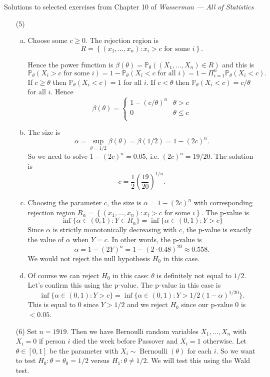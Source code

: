 \documentclass[10pt]{article}
\renewcommand{\P}{\mathbb{P}}
\newcommand{\Bern}{\operatorname{Bernoulli}}
\begin{document}
\noindent \large{Solutions to selected exercises from Chapter 10 of
\emph{Wasserman --- All of Statistics}}

\begin{enumerate}
\item[(5)]
\begin{enumerate}[(a)]
\item
Choose some $c \geq 0$. The rejection region is
\[
R = \left\{ (x_1,\ldots,x_n) : x_i > c \text{ for some } i\right\}.
\]

Hence the power function is $\beta(\theta)=\P_\theta((X_1,\ldots,X_n)\in R)$
and this is
\[
\P_\theta(X_i>c \text{ for some } i) = 1 - \P_\theta(X_i<c \text{ for all } i)
= 1 - \Pi_{i=1}^n \P_\theta(X_i < c).
\]
If $c\geq\theta$ then $\P_\theta(X_i < c) = 1$ for all $i$. If $c<\theta$ then
$\P_\theta(X_i < c) = c/\theta$ for all $i$. Hence
\[
\beta(\theta) =
\begin{cases}
1-(c/\theta)^n & \theta > c \\
0 & \theta \leq c\\
\end{cases}
\]

\item
The size is
\[
\alpha = \sup_{\theta=1/2} \beta(\theta) = \beta(1/2) = 1-(2c)^n.
\]
So we need to solve $1-(2c)^n=0.05$, i.e. $(2c)^n = 19/20$. The solution
is
\[
c=\frac{1}{2}\left(\frac{19}{20}\right)^{1/n}.
\]

\item
Choosing the parameter $c$, the size is $\alpha=1-(2c)^n$ with corresponding
rejection region
$R_\alpha = \left\{ (x_1,\ldots,x_n) : x_i > c \text{ for some } i\right\}$.
The p-value is
\[
\inf \{\alpha \in (0,1) : Y \in R_\alpha\} = \inf\{\alpha \in (0,1) : Y > c\}
\]
Since $\alpha$ is strictly monotonically decreasing with $c$, the p-value
is exactly the value of $\alpha$ when $Y=c$. In other words, the p-value is
\[\alpha=1-(2Y)^n=1-(2 \cdot 0.48)^{20} \approx 0.558.\]
We would not reject the null hypothesis $H_0$ in this case.

\item
Of course we can reject $H_0$ in this case: $\theta$ is definitely
not equal to $1/2$. Let's confirm this using the p-value.
The p-value in this case is
\[
\inf\{\alpha \in (0,1) : Y > c\} =
\inf \{\alpha \in (0,1) : Y > 1/2(1-\alpha)^{1/20}\}.
\]
This is equal to 0 since $Y > 1/2$
and we reject $H_0$ since our p-value $0$ is $<0.05$.
\end{enumerate}

\item[(6)]
Set $n=1919$. Then we have Bernoulli random variables $X_1,\ldots,X_n$
with $X_i=0$ if person $i$ died the week before Passover and $X_i=1$ otherwise.
Let $\theta\in [0,1]$ be the parameter with $X_i\sim \Bern(\theta)$ for each $i$.
So we want to test $H_0:\theta=\theta_0=1/2$ versus $H_1:\theta \neq 1/2$.
We will test this using the Wald test.


\end{enumerate}
\end{document}
